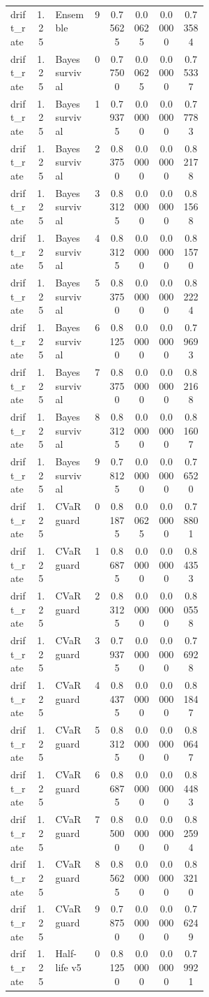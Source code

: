\documentclass{article}
\begin{document}
\begin{center}
\begin{longtable}{p{0.13\linewidth}cp{0.20\linewidth}ccccc}
drift\_rate & 1.25 & Ensemble & 9 & 0.75625 & 0.00625 & 0.00000 & 0.73584\\
drift\_rate & 1.25 & Bayes survival & 0 & 0.77500 & 0.00625 & 0.00000 & 0.75337\\
drift\_rate & 1.25 & Bayes survival & 1 & 0.79375 & 0.00000 & 0.00000 & 0.77783\\
drift\_rate & 1.25 & Bayes survival & 2 & 0.83750 & 0.00000 & 0.00000 & 0.82178\\
drift\_rate & 1.25 & Bayes survival & 3 & 0.83125 & 0.00000 & 0.00000 & 0.81568\\
drift\_rate & 1.25 & Bayes survival & 4 & 0.83125 & 0.00000 & 0.00000 & 0.81570\\
drift\_rate & 1.25 & Bayes survival & 5 & 0.83750 & 0.00000 & 0.00000 & 0.82224\\
drift\_rate & 1.25 & Bayes survival & 6 & 0.81250 & 0.00000 & 0.00000 & 0.79693\\
drift\_rate & 1.25 & Bayes survival & 7 & 0.83750 & 0.00000 & 0.00000 & 0.82168\\
drift\_rate & 1.25 & Bayes survival & 8 & 0.83125 & 0.00000 & 0.00000 & 0.81607\\
drift\_rate & 1.25 & Bayes survival & 9 & 0.78125 & 0.00000 & 0.00000 & 0.76520\\
drift\_rate & 1.25 & CVaR guard & 0 & 0.81875 & 0.00625 & 0.00000 & 0.78801\\
drift\_rate & 1.25 & CVaR guard & 1 & 0.86875 & 0.00000 & 0.00000 & 0.84353\\
drift\_rate & 1.25 & CVaR guard & 2 & 0.83125 & 0.00000 & 0.00000 & 0.80558\\
drift\_rate & 1.25 & CVaR guard & 3 & 0.79375 & 0.00000 & 0.00000 & 0.76928\\
drift\_rate & 1.25 & CVaR guard & 4 & 0.84375 & 0.00000 & 0.00000 & 0.81847\\
drift\_rate & 1.25 & CVaR guard & 5 & 0.83125 & 0.00000 & 0.00000 & 0.80647\\
drift\_rate & 1.25 & CVaR guard & 6 & 0.86875 & 0.00000 & 0.00000 & 0.84483\\
drift\_rate & 1.25 & CVaR guard & 7 & 0.85000 & 0.00000 & 0.00000 & 0.82594\\
drift\_rate & 1.25 & CVaR guard & 8 & 0.85625 & 0.00000 & 0.00000 & 0.83210\\
drift\_rate & 1.25 & CVaR guard & 9 & 0.78750 & 0.00000 & 0.00000 & 0.76249\\
drift\_rate & 1.25 & Half-life v5 & 0 & 0.81250 & 0.00000 & 0.00000 & 0.79921\\

\end{longtable}
\end{center}
\end{document}
